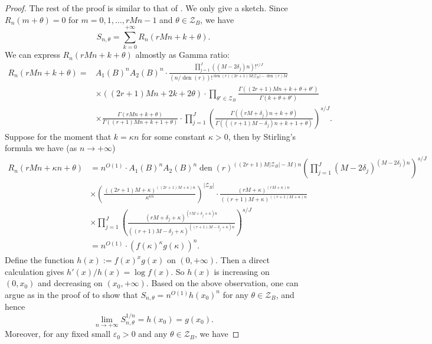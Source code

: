 \documentclass[12pt]{article}
\numberwithin{equation}{section}
\begin{document}
\begin{proof}
The rest of the proof is similar to that of \cite[Lem. 4.1]{LY2020}. We only give a sketch. Since $R_n(m+\theta) = 0$ for $m=0,1,\ldots,rMn - 1$ and $\theta \in \mathcal{Z}_B$, we have 
\[ S_{n,\theta} = \sum_{k=0}^{+\infty} R_n(rMn+k+\theta). \]
We can express $R_n(rMn+k+\theta)$ almostly as Gamma ratio:  
\begin{align*}
	R_n(rMn+k+\theta) =&  A_1(B)^n A_2(B)^n \cdot \frac{\prod_{j=1}^{J} \left( (M-2\delta_j)n \right)!^{s/J} }{\left( n/\operatorname{den}(r) \right)!^{\operatorname{den}(r)(2r+1)M|\mathcal{Z}_B| - \operatorname{den}(r)M }} \\
	&\times ((2r+1)Mn+2k+2\theta) \cdot \prod_{\theta' \in \mathcal{Z}_B} \frac{\Gamma((2r+1)Mn+k+\theta+\theta')}{\Gamma(k+\theta+\theta')} \\
	&\times \frac{\Gamma\left( rMn + k + \theta \right)}{\Gamma\left( (r+1)Mn + k + 1 + \theta \right)} \cdot \prod_{j=1}^{J} \left( \frac{\Gamma\left( (rM+\delta_j)n + k + \theta \right)}{\Gamma\left( ((r+1)M-\delta_j)n + k + 1 + \theta \right)} \right)^{s/J}.
\end{align*}
Suppose for the moment that $k = \kappa n$ for some constant $\kappa > 0$, then by Stirling's formula we have (as $n \to +\infty$)
\begin{align*}
	R_n(rMn+\kappa n+\theta) &= n^{O(1)} \cdot A_1(B)^n A_2(B)^n \operatorname{den}(r)^{((2r+1)M|\mathcal{Z}_B|-M)n} \left( \prod_{j=1}^{J} (M-2\delta_j)^{(M-2\delta_j)n} \right)^{s/J} \\
	&\times \left( \frac{((2r+1)M+\kappa)^{((2r+1)M+\kappa)n}}{\kappa^{\kappa n}} \right)^{|\mathcal{Z}_B|} \cdot \frac{(rM+\kappa)^{(rM+\kappa)n}}{((r+1)M + \kappa)^{((r+1)M + \kappa)n}} \\
	&\times \prod_{j=1}^{J} \left(  \frac{(rM+\delta_j+\kappa)^{(rM+\delta_j+\kappa)n}}{((r+1)M-\delta_j+\kappa)^{((r+1)M-\delta_j+\kappa)n}}  \right)^{s/J} \\
	&= n^{O(1)} \cdot \left( f(\kappa)^{\kappa}g(\kappa) \right)^n.
\end{align*}
Define the function $h(x):=f(x)^x g(x)$ on $(0,+\infty)$. Then a direct calculation gives $h'(x) / h(x) = \log f(x)$. So $h(x)$ is increasing on $(0,x_0)$ and decreasing on $(x_0,+\infty)$. Based on the above observation, one can argue as in the proof of \cite[Lem. 4.1]{LY2020} to show that $S_{n,\theta} = n^{O(1)} h(x_0)^n$ for any $\theta \in \mathcal{Z}_B$, and hence
\[ \lim_{n \to +\infty} S_{n,\theta}^{1/n} = h(x_0) = g(x_0). \]
Moreover, for any fixed small $\varepsilon_0 > 0$ and any $\theta \in \mathcal{Z}_B$, we have

\end{proof}
\end{document}
